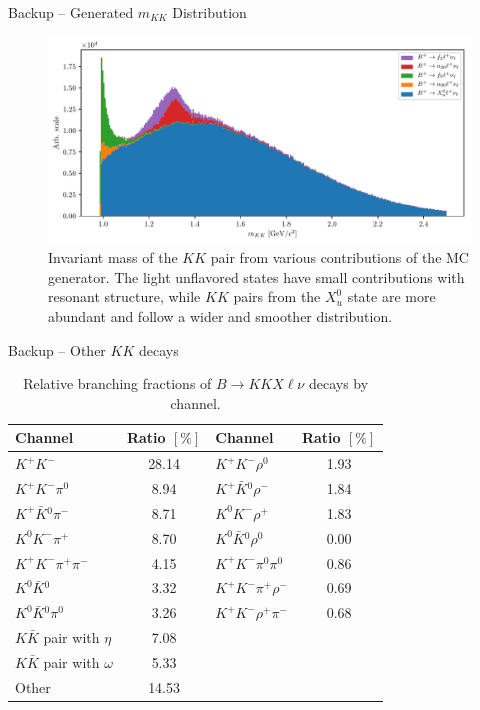 \documentclass[serif]{beamer}
\begin{document}
\begin{frame}[t]{Backup -- Generated $m_{KK}$ Distribution}
\vspace{-3mm}
\small

\begin{figure}[H]
	\centering
	\includegraphics[width=\linewidth]{fig/KKlnu_src}
	\caption{Invariant mass of the $KK$ pair from various contributions of the MC generator. The light unflavored states have small contributions with resonant structure, while $KK$ pairs from the $X_u^0$ state are more abundant and follow a wider and smoother distribution.}
\end{figure}

\end{frame}

\begin{frame}[t]{Backup -- Other $KK$ decays}
\vspace{-3mm}
\small
\begin{table}[H]
	\centering
	\begin{tabular}{l|c||l|c}
		Channel & Ratio $[\%]$ & Channel & Ratio $[\%]$ \\
		\toprule 
		$K^+ K^-$ & 28.14 & $K^+ K^- \rho^0$ & 1.93 \\
		$K^+ K^- \pi^0$ & 8.94 & $K^+ \bar{K}{}^0 \rho^-$ & 1.84 \\
		$K^+ \bar{K}{}^0 \pi^-$ & 8.71 & $K^0 K^- \rho^+$ & 1.83 \\
		$K^0 K^- \pi^+$ & 8.70 & $K^0 \bar K {}^0 \rho^0$ & 0.00 \\
		$K^+ K^- \pi^+ \pi^-$ & 4.15 &  $K^+ K^- \pi^0 \pi^0$ & 0.86 \\
		$K^0 \bar K {}^0$ & 3.32  & $K^+ K^- \pi^+ \rho^-$ & 0.69 \\
		$K^0 \bar K {}^0 \pi^0$ & 3.26 & $K^+ K^- \rho^+ \pi^-$ & 0.68 \\
		\midrule
		$K \bar K$ pair with $\eta$ & 7.08  & & \\
		$K \bar K$ pair with $\omega$ & 5.33  & & \\
		Other & 14.53  & & \\
		\bottomrule 
	\end{tabular}
	\caption{Relative branching fractions of $B \to KKX\ell \nu$ decays by channel.}
\end{table}

\end{frame}
\end{document}
